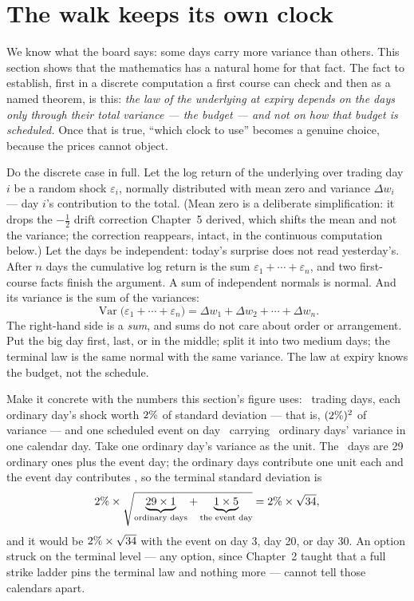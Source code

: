 \section{The walk keeps its own clock}
\label{sec:clkwalk}

We know what the board says: some days carry more variance than
others.  This section shows that the mathematics has a natural home
for that fact.  The fact to establish, first in a discrete
computation a first course can check and then as a named theorem, is
this: \emph{the law of the underlying at expiry depends on the days
only through their total variance --- the budget --- and not on how
that budget is scheduled.}  Once that is true, ``which clock to use''
becomes a genuine choice, because the prices cannot object.

Do the discrete case in full.  Let the log return of the underlying
over trading day $i$ be a random shock $\varepsilon_i$, normally
distributed with mean zero and variance $\Delta w_i$ --- day $i$'s
contribution to the total.  (Mean zero is a deliberate
simplification: it drops the $-\tfrac12$ drift correction Chapter~5
derived, which shifts the mean and not the variance; the correction
reappears, intact, in the continuous computation below.)  Let the
days be independent: today's surprise does not read yesterday's.  After $n$ days the cumulative log return is the sum
$\varepsilon_1+\cdots+\varepsilon_n$, and two first-course facts
finish the argument.  A sum of independent normals is normal.  And
its variance is the sum of the variances:
\[
\operatorname{Var}\!\big(\varepsilon_1+\cdots+\varepsilon_n\big)
=\Delta w_1+\Delta w_2+\cdots+\Delta w_n .
\]
The right-hand side is a \emph{sum}, and sums do not care about order
or arrangement.  Put the big day first, last, or in the middle; split
it into two medium days; the terminal law is the same normal with the
same variance.  The law at expiry knows the budget, not the schedule.

Make it concrete with the numbers this section's figure uses:
\MacClkWalkDays\ trading days, each ordinary day's shock worth
$2\%$ of standard deviation --- that is,
$(2\%)^2$ of variance --- and one scheduled event on
day \MacClkWalkEventDay\ carrying \MacClkWalkEventUnits\ ordinary
days' variance in one calendar day.  Take one ordinary day's variance
as the unit.  The \MacClkWalkDays\ days are 29 ordinary ones plus the
event day; the ordinary days contribute one unit each and the event
day contributes \MacClkWalkEventUnits, so the terminal standard
deviation is
\[
2\%\times
\sqrt{\underbrace{29\times1}_{\text{ordinary days}}
+\underbrace{1\times5}_{\text{the event day}}}
=2\%\times\sqrt{34},
\]
and it would be $2\%\times\sqrt{34}$ with the event
on day 3, day 20, or day 30.  An option struck on the terminal level
--- any option, since Chapter~2 taught that a full strike ladder pins
the terminal law and nothing more --- cannot tell those calendars
apart.

